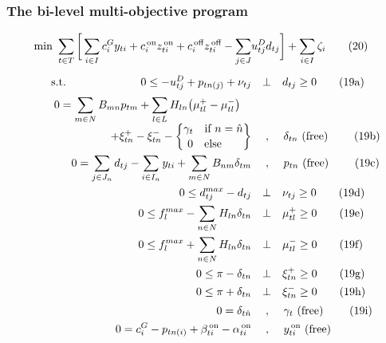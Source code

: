 \documentclass[9pt,a4paper]{article}
\newcommand{\st}{\text{s.t.} \quad}
\newcommand{\free}{\text{ (free) } }
\newcommand{\botcomma}{\; , \,}
\newcommand{\on}{^{\,\text{on}}}
\newcommand{\off}{^{\,\text{off}}}
\begin{document}
\subsubsection*{The bi-level multi-objective program}
\begin{subequations} 
\begin{align}
\min \ \sum_{t \in T} \bigg[
\sum_{i \in I} c^G_{i} y_{ti} + c\on_{i} z\on_{ti} + c\off_{i} z\off_{ti}
- \sum_{j \in J} & u^D_{tj} d_{tj}
\bigg]
+ \sum_{i \in I} \zeta_i 
	\tag{20} \label{example:MO:optimization} \\[5 pt]
\st \hspace{2 cm}
0 \leq - u^D_{tj} + p_{tn(j)} + \nu_{tj} &\quad \bot \quad d_{tj} \geq 0 
	\tag{19a} \label{example:ISO:KKT:demand} \\[2 pt]
0 = \sum_{m\in N} B_{mn} p_{tm} 
+ \sum_{l \in L} H_{ln} \big( \mu^+_{tl} - \mu^-_{tl}\big) \quad & \nonumber \\[- 4 pt]
+ \xi^+_{tn} - \xi^-_{tn} - 
\genfrac\{\}{0pt}{0}{\gamma_t \quad \text{if }n = \hat{n}}{0 \quad \text{else} \hspace{0.55 cm}}
& \quad \botcomma \quad \delta_{tn} \free \tag{19b} \label{example:ISO:KKT:delta} \\
0 = \sum_{j \in J_n} d_{tj} - \sum_{i \in I_n} y_{ti} + \sum_{m \in N} B_{nm} \delta_{tm} &\quad \botcomma \quad p_{tn} \free 
	\tag{19c} \label{example:ISO:KKT:MBC} \\
0 \leq d^{max}_{tj} - d_{tj} &\quad \bot \quad \nu_{tj} \geq 0 
	\tag{19d} \label{example:ISO:KKT:demand:max} \\
0 \leq f^{max}_l - \sum_{n \in N} H_{ln} \delta_{tn} &\quad \bot \quad \mu^+_{tl} \geq 0 
	\tag{19e} \label{example:ISO:KKT:flow:pos} \\
0 \leq f^{max}_l + \sum_{n \in N} H_{ln} \delta_{tn} &\quad \bot \quad  \mu^-_{tl} \geq 0
	\tag{19f}  \label{example:ISO:KKT:flow:neg} \\
0 \leq \pi - \delta_{tn} &\quad \bot \quad \xi^+_{tn} \geq 0
	\tag{19g}  \label{example:ISO:KKT:angle:pos} \\
0 \leq \pi + \delta_{tn} &\quad \bot \quad \xi^-_{tn} \geq 0 
	\tag{19h} \label{example:ISO:KKT:angle:neg} \\[2 pt]
0 = \delta_{t\hat{n}}  &\quad \botcomma \quad \gamma_t \free 
	\tag{19i} \label{example:ISO:KKT:slackbus} \\
0 = c^G_{i} - p_{tn(i)} + \beta\on_{ti} - \alpha\on_{ti} &\quad \botcomma \quad y\on_{ti} \free 

\end{align}
\end{subequations}
\end{document}
